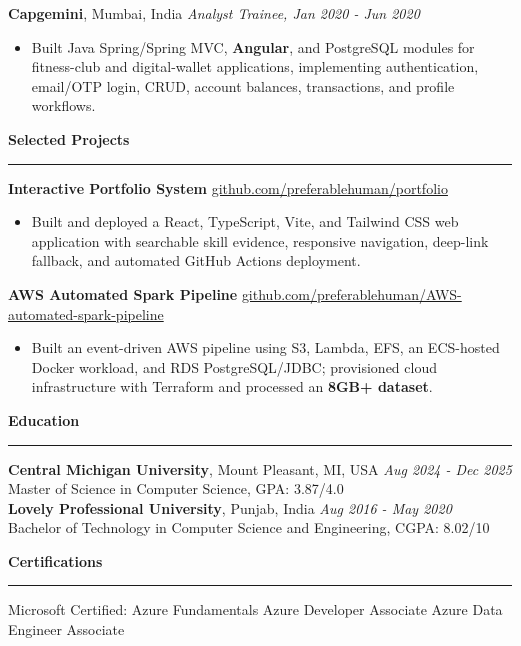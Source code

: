 \documentclass[11pt,letterpaper]{article}
\newcommand{\ressection}[1]{\Needspace{6\baselineskip}\vspace{8pt}\par\textbf{#1}\par\vspace{2pt}\hrule\vspace{5pt}}
\begin{document}
\textbf{Capgemini}, Mumbai, India \hfill \textit{Analyst Trainee, Jan 2020 - Jun 2020}
\begin{itemize}
  \item Built Java Spring/Spring MVC, \textbf{Angular}, and PostgreSQL modules for fitness-club and digital-wallet applications, implementing authentication, email/OTP login, CRUD, account balances, transactions, and profile workflows.
\end{itemize}

\ressection{Selected Projects}
\textbf{Interactive Portfolio System} \hfill \href{https://github.com/preferablehuman/portfolio}{github.com/preferablehuman/portfolio}
\begin{itemize}
  \item Built and deployed a React, TypeScript, Vite, and Tailwind CSS web application with searchable skill evidence, responsive navigation, deep-link fallback, and automated GitHub Actions deployment.
\end{itemize}
\vspace{2pt}
\textbf{AWS Automated Spark Pipeline} \hfill \href{https://github.com/preferablehuman/AWS-automated-spark-pipeline}{github.com/preferablehuman/AWS-automated-spark-pipeline}
\begin{itemize}
  \item Built an event-driven AWS pipeline using S3, Lambda, EFS, an ECS-hosted Docker workload, and RDS PostgreSQL/JDBC; provisioned cloud infrastructure with Terraform and processed an \textbf{8GB+ dataset}.
\end{itemize}

\ressection{Education}
\textbf{Central Michigan University}, Mount Pleasant, MI, USA \hfill \textit{Aug 2024 - Dec 2025}\\
Master of Science in Computer Science, GPA: 3.87/4.0\\[2pt]
\textbf{Lovely Professional University}, Punjab, India \hfill \textit{Aug 2016 - May 2020}\\
Bachelor of Technology in Computer Science and Engineering, CGPA: 8.02/10

\ressection{Certifications}
Microsoft Certified: Azure Fundamentals \textbar{} Azure Developer Associate \textbar{} Azure Data Engineer Associate
\end{document}
